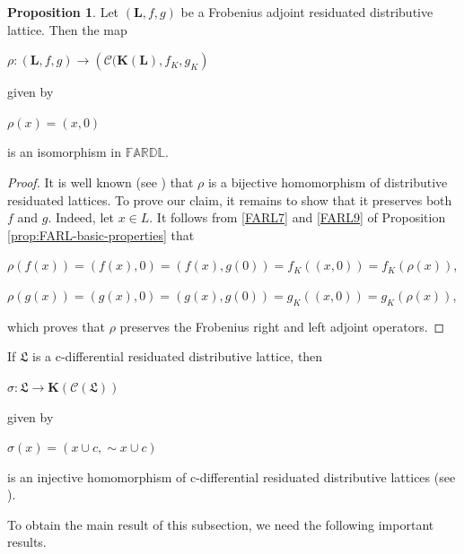 \documentclass[final,12pt,times]{elsarticle}
\theoremstyle{plain}
\theoremstyle{definition}
\newtheorem{proposition}[definition]{Proposition}
\theoremstyle{break}
\begin{document}
\begin{proposition}\label{proposition5.12.} Let $(\mathbf{L},f,g)$ be a Frobenius adjoint residuated distributive lattice. Then the map
\begin{center} $\rho:(\mathbf{L},f,g)\rightarrow (\mathcal{C(\mathbf{K(L)}},f_K,g_K)$
\end{center} given by
\begin{center} $\rho(x)=(x,0)$
\end{center} is an isomorphism in $\mathbb{FARDL}$.
\end{proposition}
\begin{proof} 
It is well known (see \cite{Castiglionib}) that $\rho$ is a bijective homomorphism of distributive residuated lattices. To prove our claim, it remains to show that it preserves both $f$ and $g$. Indeed, let $x \in L$. It follows from \ref{FARL7} and \ref{FARL9} of Proposition \ref{prop:FARL-basic-properties} that
\begin{center} $\rho(f(x))=(f(x),0)=(f(x),g(0))=f_K((x,0))=f_K(\rho(x))$,

$\rho(g(x))=(g(x),0)=(g(x), g(0))=g_K((x,0))=g_K(\rho(x))$,

\end{center} which proves that $\rho$ preserves the Frobenius right and left adjoint operators.
\end{proof}

If $\boldsymbol{\mathfrak{L}}$ is a c-differential residuated distributive lattice, then
\begin{center} $\sigma:\boldsymbol{\mathfrak{L}}\rightarrow  \mathbf{K}(\mathcal{C(\boldsymbol{\mathfrak{L}})})$
\end{center} given by
\begin{center} $\sigma(x)=(x\cup c,\sim x\cup c)$
\end{center} is an injective homomorphism of c-differential residuated distributive lattices (see \cite{Castiglionib}).

To obtain the main result of this subsection, we need the following important results.
\end{document}
